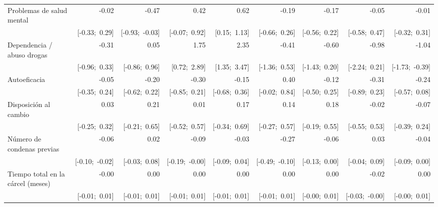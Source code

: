 \begin{sidewaystable}[htp]
\begin{center}
{\begin{tabular}{l D{.}{.}{3.11} D{.}{.}{3.11} D{.}{.}{3.11} D{.}{.}{3.11} D{.}{.}{3.11} D{.}{.}{3.11} D{.}{.}{3.11} D{.}{.}{3.11} }
Problemas de salud mental         & -0.02           & -0.47           & 0.42            & 0.62            & -0.19           & -0.17           & -0.05           & -0.01           \\
                                  & [-0.33;\ 0.29]  & [-0.93;\ -0.03] & [-0.07;\ 0.92]  & [0.15;\ 1.13]   & [-0.66;\ 0.26]  & [-0.56;\ 0.22]  & [-0.58;\ 0.47]  & [-0.32;\ 0.31]  \\
Dependencia / abuso drogas        & -0.31           & 0.05            & 1.75            & 2.35            & -0.41           & -0.60           & -0.98           & -1.04           \\
                                  & [-0.96;\ 0.33]  & [-0.86;\ 0.96]  & [0.72;\ 2.89]   & [1.35;\ 3.47]   & [-1.36;\ 0.53]  & [-1.43;\ 0.20]  & [-2.24;\ 0.21]  & [-1.73;\ -0.39] \\
Autoeficacia                      & -0.05           & -0.20           & -0.30           & -0.15           & 0.40            & -0.12           & -0.31           & -0.24           \\
                                  & [-0.35;\ 0.24]  & [-0.62;\ 0.22]  & [-0.85;\ 0.21]  & [-0.68;\ 0.36]  & [-0.02;\ 0.84]  & [-0.50;\ 0.25]  & [-0.89;\ 0.23]  & [-0.57;\ 0.08]  \\
Disposición al cambio             & 0.03            & 0.21            & 0.01            & 0.17            & 0.14            & 0.18            & -0.02           & -0.07           \\
                                  & [-0.25;\ 0.32]  & [-0.21;\ 0.65]  & [-0.52;\ 0.57]  & [-0.34;\ 0.69]  & [-0.27;\ 0.57]  & [-0.19;\ 0.55]  & [-0.55;\ 0.53]  & [-0.39;\ 0.24]  \\
Número de condenas previas        & -0.06           & 0.02            & -0.09           & -0.03           & -0.27           & -0.06           & 0.03            & -0.04           \\
                                  & [-0.10;\ -0.02] & [-0.03;\ 0.08]  & [-0.19;\ -0.00] & [-0.09;\ 0.04]  & [-0.49;\ -0.10] & [-0.13;\ 0.00]  & [-0.04;\ 0.09]  & [-0.09;\ 0.00]  \\
Tiempo total en la cárcel (meses) & -0.00           & 0.00            & 0.00            & 0.00            & 0.00            & 0.00            & -0.02           & 0.00            \\
                                  & [-0.01;\ 0.01]  & [-0.01;\ 0.01]  & [-0.01;\ 0.01]  & [-0.01;\ 0.01]  & [-0.01;\ 0.01]  & [-0.00;\ 0.01]  & [-0.03;\ -0.00] & [-0.00;\ 0.01]  \\

\end{tabular}}
\end{center}
\end{sidewaystable}
